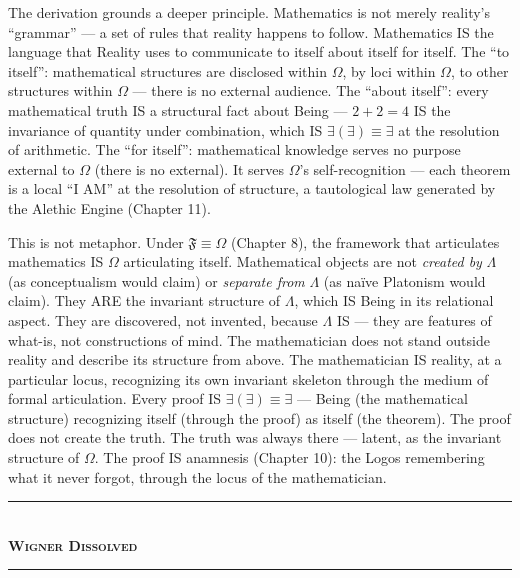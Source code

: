 \documentclass[10pt, openany, oneside]{book}
\renewcommand{\normalsize}{\fontsize{10}{13}\selectfont}
\begin{document}
\vspace{0.8em}

\noindent The derivation grounds a deeper principle. Mathematics is not merely reality's ``grammar'' --- a set of rules that reality happens to follow. Mathematics IS the language that Reality uses to communicate to itself about itself for itself. The ``to itself'': mathematical structures are disclosed within $\Omega$, by loci within $\Omega$, to other structures within $\Omega$ --- there is no external audience. The ``about itself'': every mathematical truth IS a structural fact about Being --- $2 + 2 = 4$ IS the invariance of quantity under combination, which IS $\exists(\exists) \equiv \exists$ at the resolution of arithmetic. The ``for itself'': mathematical knowledge serves no purpose external to $\Omega$ (there is no external). It serves $\Omega$'s self-recognition --- each theorem is a local ``I AM'' at the resolution of structure, a tautological law generated by the Alethic Engine (Chapter 11).

This is not metaphor. Under $\mathfrak{F} \equiv \Omega$ (Chapter 8), the framework that articulates mathematics IS $\Omega$ articulating itself. Mathematical objects are not \textit{created by} $\Lambda$ (as conceptualism would claim) or \textit{separate from} $\Lambda$ (as na\"{i}ve Platonism would claim). They ARE the invariant structure of $\Lambda$, which IS Being in its relational aspect. They are discovered, not invented, because $\Lambda$ IS --- they are features of what-is, not constructions of mind. The mathematician does not stand outside reality and describe its structure from above. The mathematician IS reality, at a particular locus, recognizing its own invariant skeleton through the medium of formal articulation. Every proof IS $\exists(\exists) \equiv \exists$ --- Being (the mathematical structure) recognizing itself (through the proof) as itself (the theorem). The proof does not create the truth. The truth was always there --- latent, as the invariant structure of $\Omega$. The proof IS anamnesis (Chapter 10): the Logos remembering what it never forgot, through the locus of the mathematician.

\vspace{1.5em}


\begin{center}
    \rule{0.3\textwidth}{0.4pt}\\[0.5em]
    {\normalsize\bfseries\scshape Wigner Dissolved}\\[0.3em]
    \rule{0.3\textwidth}{0.4pt}
\end{center}
\end{document}
